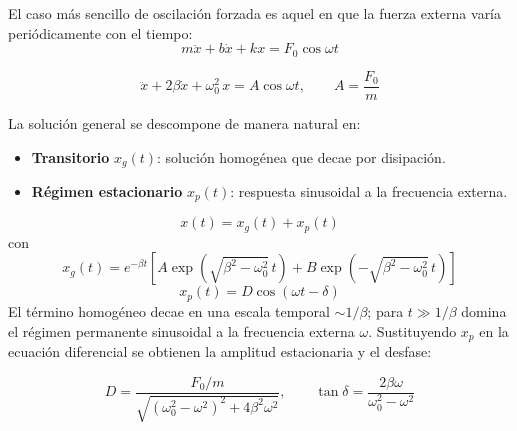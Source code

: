 \documentclass[12pt, a4paper]{article}
\theoremstyle{plain}
\theoremstyle{definition}
\theoremstyle{remark}
\begin{document}
El caso más sencillo de oscilación forzada es aquel en que la fuerza externa varía
periódicamente con el tiempo:
\begin{equation}
  m\ddot{x} + b\dot{x} + kx = F_0\cos\omega t
\end{equation}
\begin{mdframed}[style=resultado]
\begin{equation}
  \ddot{x} + 2\beta\dot{x} + \omega_0^2\,x = A\cos\omega t, \qquad A = \frac{F_0}{m}
\end{equation}
\end{mdframed}

La solución general se descompone de manera natural en:
\begin{itemize}
  \item \textbf{Transitorio} $x_g(t)$: solución homogénea que decae por disipación.
  \item \textbf{Régimen estacionario} $x_p(t)$: respuesta sinusoidal a la frecuencia externa.
\end{itemize}
\begin{equation}
  x(t)=x_g(t)+x_p(t)
\end{equation}
\noindent con
\begin{equation}
  x_g(t) = e^{-\beta t}\!\left[A\exp\!\left(\sqrt{\beta^2-\omega_0^2}\,t\right)
            + B\exp\!\left(-\sqrt{\beta^2-\omega_0^2}\,t\right)\right]
\end{equation}
\begin{equation}
  x_p(t) = D\cos(\omega t - \delta)
\end{equation}
El término homogéneo decae en una escala temporal $\sim 1/\beta$; para
$t\gg 1/\beta$ domina el régimen permanente sinusoidal a la frecuencia externa $\omega$.
Sustituyendo $x_p$ en la ecuación diferencial se obtienen la amplitud estacionaria y el
desfase:
\begin{mdframed}[style=resultado]
\begin{equation}
  D = \frac{F_0/m}{\sqrt{(\omega_0^2-\omega^2)^2 + 4\beta^2\omega^2}},
  \qquad
  \tan\delta = \frac{2\beta\omega}{\omega_0^2 - \omega^2}
\end{equation}
\end{mdframed}
\end{document}
